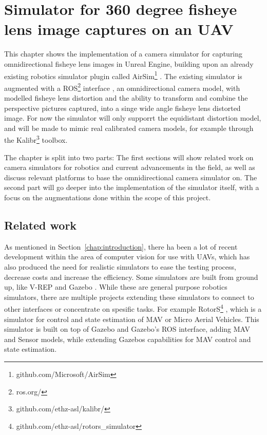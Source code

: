 
\chapter{Simulator for 360 degree fisheye lens image captures on an UAV}

This chapter shows the implementation of a camera simulator for capturing omnidirectional fisheye lens images in Unreal Engine, building upon an already existing robotics simulator plugin called AirSim\footnote{github.com/Microsoft/AirSim} \cite{Airsim_paper}. The existing simulator is augmented with a ROS\footnote{ros.org/} interface , an omnidirectional camera model, with modelled fisheye lens distortion and the ability to transform and combine the perspective pictures captured, into a singe wide angle fisheye lens distorted image. For now the simulator will only supporrt the equidistant distortion model, and will be made to mimic real calibrated camera models, for example through the Kalibr\footnote{github.com/ethz-asl/kalibr/} toolbox.

The chapter is split into two parts: The first sections will show related work on camera simulators for robotics and current advancements in the field, as well as discuss relevant platforms to base the omnidirectional camera simulator on. The second part will go deeper into the implementation of the simulator itself, with a focus on the augmentations done within the scope of this project.

\section{Related work} \label{sec:simulator_related}

As mentioned in Section~\ref{chap:introduction}, there ha been a lot of recent development within the area of computer vision for use with UAVs, which has also produced the need for realistic simulators to ease the testing process, decrease costs and increase the efficiency. Some simulators are built from ground up, like V-REP \cite{VREP2013} and Gazebo \cite{GazeboPaper}. While these are general purpose robotics simulators, there are multiple projects extending these simulators to connect to other interfaces or concentrate on spesific tasks. For example RotorS\footnote{github.com/ethz-asl/rotors\_simulator} \cite{RotorS}, which is a simulator for control and state estimation of MAV or Micro Aerial Vehicles. This simulator is built on top of Gazebo and Gazebo's ROS interface, adding MAV and Sensor models, while extending Gazebos capabilities for MAV control and state estimation.

